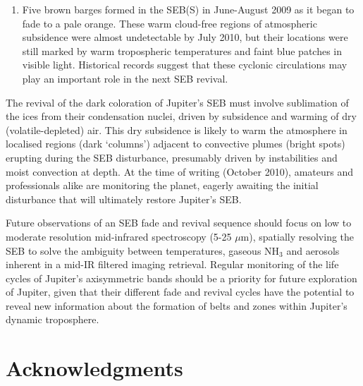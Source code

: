 \documentclass[final,5p,times,twocolumn,authoryear]{elsarticle}
\begin{document}
\begin{enumerate}
\item Five brown barges formed in the SEB(S) in June-August 2009 as it began to fade to a pale orange.  These warm cloud-free regions of atmospheric subsidence were almost undetectable by July 2010, but their locations were still marked by warm tropospheric temperatures and faint blue patches in visible light.  Historical records suggest that these cyclonic circulations may play an important role in the next SEB revival.

\end{enumerate}

The revival of the dark coloration of Jupiter's SEB must involve sublimation of the ices from their condensation nuclei, driven by subsidence and warming of dry (volatile-depleted) air.  This dry subsidence is likely to warm the atmosphere in localised regions (dark `columns') adjacent to convective plumes (bright spots) erupting during the SEB disturbance, presumably driven by instabilities and moist convection at depth.  At the time of writing (October 2010), amateurs and professionals alike are monitoring the planet, eagerly awaiting the initial disturbance that will ultimately restore Jupiter's SEB.

Future observations of an SEB fade and revival sequence should focus on low to moderate resolution mid-infrared spectroscopy (5-25 $\mu$m), spatially resolving the SEB to solve the ambiguity between temperatures, gaseous NH$_3$ and aerosols inherent in a mid-IR filtered imaging retrieval.  Regular monitoring of the life cycles of Jupiter's axisymmetric bands should be a priority for future exploration of Jupiter, given that their different fade and revival cycles have the potential to reveal new information about the formation of belts and zones within Jupiter's dynamic troposphere.

\section*{Acknowledgments}
\end{document}
